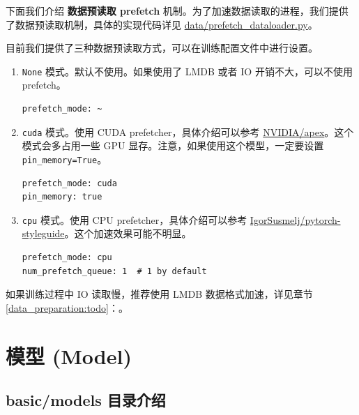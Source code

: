 \documentclass[../main.tex]{subfiles}
\begin{document}
下面我们介绍 \textbf{数据预读取 prefetch} 机制。为了加速数据读取的进程，我们提供了数据预读取机制，具体的实现代码详见 \href{https://github.com/XPixelGroup/BasicSR/blob/master/basicsr/data/prefetch\_dataloader.py}{data/prefetch\_dataloader.py}。

目前我们提供了三种数据预读取方式，可以在训练配置文件中进行设置。

\begin{enumerate}
    \item \texttt{None} 模式。默认不使用。如果使用了 LMDB 或者 IO 开销不大，可以不使用 prefetch。
\begin{verbatim}
prefetch_mode: ~
\end{verbatim}

    \item \texttt{cuda} 模式。使用 CUDA prefetcher，具体介绍可以参考 \href{https://github.com/NVIDIA/apex/issues/304#}{NVIDIA/apex}。这个模式会多占用一些 GPU 显存。注意，如果使用这个模型，一定要设置 \texttt{pin\_memory=True}。
\begin{verbatim}
prefetch_mode: cuda
pin_memory: true
\end{verbatim}

\item \texttt{cpu} 模式。使用 CPU prefetcher，具体介绍可以参考 \href{https://github.com/IgorSusmelj/pytorch-styleguide/issues/5#}{IgorSusmelj/pytorch-styleguide}。这个加速效果可能不明显。
\begin{verbatim}
prefetch_mode: cpu
num_prefetch_queue: 1  # 1 by default
\end{verbatim}
\end{enumerate}

\begin{note} %
    如果训练过程中 IO 读取慢，推荐使用 LMDB 数据格式加速，详见章节\ref{data_preparation:todo}：。 
\end{note}

\section{模型 (Model)}\label{code_structure:model}

\subsection{basic/models 目录介绍}\label{code_structure:model_contents}
\end{document}
